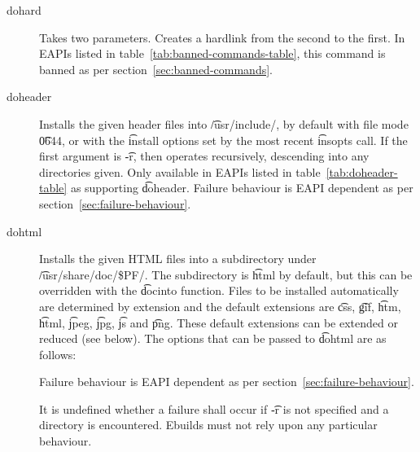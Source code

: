 \begin{description}
\item[dohard] Takes two parameters. Creates a hardlink from the second to the first. In EAPIs
    listed in table~\ref{tab:banned-commands-table}, this command is banned as per
    section~\ref{sec:banned-commands}.

\item[doheader]  Installs the given header files into \t{/usr/include/},
    by default with file mode \t{0644}, or with the \t{install} options set by the most recent
    \t{insopts} call. If the first argument is \t{-r}, then operates recursively, descending
    into any directories given.
    Only available in EAPIs listed in table~\ref{tab:doheader-table} as supporting \t{doheader}.
    Failure behaviour is EAPI dependent as per section~\ref{sec:failure-behaviour}.

\item[dohtml] Installs the given HTML files into a subdirectory under \t{/usr/share/doc/\$PF/}.
The subdirectory is \t{html} by default, but this can be overridden with the \t{docinto} function.
Files to be installed automatically are determined by extension and the default extensions are
\t{css}, \t{gif}, \t{htm}, \t{html}, \t{jpeg}, \t{jpg}, \t{js} and \t{png}. These default extensions
can be extended or reduced (see below). The options that can be passed to \t{dohtml} are as follows:

    Failure behaviour is EAPI dependent as per section~\ref{sec:failure-behaviour}.

    It is undefined whether a failure shall occur if \t{-r} is not specified and a directory is
    encountered. Ebuilds must not rely upon any particular behaviour.


\end{description}

